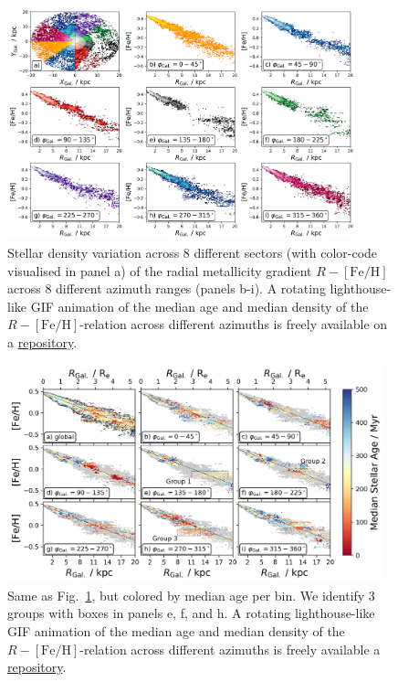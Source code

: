 \documentclass[twocolumn,apj,numberedappendix,appendixfloats,twocolappendix]{openjournal}
\begin{document}
\begin{CJK*}{UTF8}{gbsn}
\begin{figure}
    \centering
    \includegraphics[width=0.9\textwidth]{figures/radial_metallicity_gradients_mw_in_angles.png}
    \caption{Stellar density variation across 8 different sectors (with color-code visualised in panel a) of the radial metallicity gradient $R-\mathrm{[Fe/H]}$ across 8 different azimuth ranges (panels b-i). A rotating lighthouse-like GIF animation of the median age and median density of the $R-\mathrm{[Fe/H]}$-relation across different azimuths is freely available on a \href{https://github.com/svenbuder/nihao_radial_metallicity_gradients/blob/main/figures/xyz_rfeh.gif}{repository}.}
    \label{fig:radial_metallicity_gradients_mw_in_angles}
\end{figure}

\begin{figure}
    \centering
    \includegraphics[width=0.975\textwidth]{figures/radial_metallicity_gradients_mw_in_angles_age.png}
    \caption{Same as Fig.~\ref{fig:radial_metallicity_gradients_mw_in_angles}, but colored by median age per bin. We identify 3 groups with boxes in panels e, f, and h. A rotating lighthouse-like GIF animation of the median age and median density of the $R-\mathrm{[Fe/H]}$-relation across different azimuths is freely available a \href{https://github.com/svenbuder/nihao_radial_metallicity_gradients/blob/main/figures/xyz_rfeh.gif}{repository}.}
    \label{fig:radial_metallicity_gradients_mw_in_angles_age}
\end{figure}


\end{CJK*}
\end{document}
